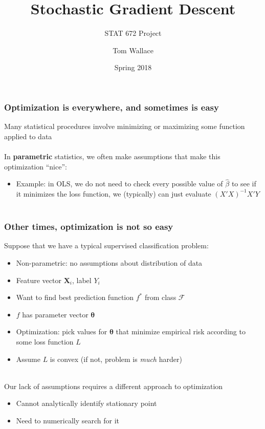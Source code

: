 \documentclass{beamer}
\title{Stochastic Gradient Descent}
\subtitle{STAT 672 Project}
\author{Tom Wallace}
\institute{George Mason University}
\date{Spring 2018}
\begin{document}
\frame{\titlepage}


\begin{frame}
	\frametitle{Optimization is everywhere, and sometimes is easy}
	Many statistical procedures involve minimizing or maximizing some function 
	applied to data \\~\\

	In \textbf{parametric} statistics, we often make assumptions that make this optimization ``nice'':
	\begin{itemize}
		\item \small Example: in OLS, we do not need to check every possible value
			of $\hat{\beta}$ to see if it minimizes the loss
			function, we (typically) can just evaluate
			$(X'X)^{-1}X'Y$ \\~\\
	\end{itemize}
	\smallskip

	\centering
\end{frame}

\begin{frame}
	\frametitle{Other times, optimization is not so easy}
	Suppose that we have a typical supervised classification problem:
	\begin{itemize}
		\item \small Non-parametric: no assumptions about distribution of data
		\item Feature vector $\mathbf{X}_i$, label $Y_i$
		\item Want to find best prediction function $f^*$ from class $\mathcal{F}$
		\item $f$ has parameter vector $\bm{\theta}$
		\item Optimization: pick values for $\bm{\theta}$ that minimize
			empirical risk according to some
			loss function $L$
		\item Assume $L$ is convex (if not, problem is \textit{much}
			harder)\\~\\
	\end{itemize}

	Our lack of assumptions requires a different approach to optimization
	\begin{itemize}
		\item \small Cannot analytically identify stationary point
		\item Need to numerically search for it
	\end{itemize}
\end{frame}
\end{document}
